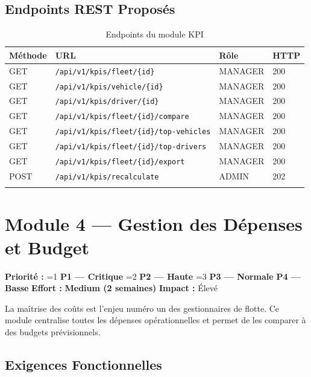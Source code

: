 \documentclass[12pt,a4paper]{report}
\newcommand{\prio}[1]{%
  \ifnum#1=1 \textcolor{fleeterror}{\textbf{P1 — Critique}}%
  \else\ifnum#1=2 \textcolor{fleetwarning}{\textbf{P2 — Haute}}%
  \else\ifnum#1=3 \textcolor{fleetsuccess}{\textbf{P3 — Normale}}%
  \else \textcolor{fleetgray}{\textbf{P4 — Basse}}%
  \fi\fi\fi}
\newcommand{\effort}[1]{\textcolor{fleetpurple}{\textbf{#1}}}
\begin{document}
\section{Endpoints REST Proposés}

\begin{longtable}{p{1.5cm}p{7cm}p{2.5cm}p{1.5cm}}
\toprule
\textbf{Méthode} & \textbf{URL} & \textbf{Rôle} & \textbf{HTTP} \\
\midrule
\endhead
GET & \texttt{/api/v1/kpis/fleet/\{id\}} & MANAGER & 200 \\
GET & \texttt{/api/v1/kpis/vehicle/\{id\}} & MANAGER & 200 \\
GET & \texttt{/api/v1/kpis/driver/\{id\}} & MANAGER & 200 \\
GET & \texttt{/api/v1/kpis/fleet/\{id\}/compare} & MANAGER & 200 \\
GET & \texttt{/api/v1/kpis/fleet/\{id\}/top-vehicles} & MANAGER & 200 \\
GET & \texttt{/api/v1/kpis/fleet/\{id\}/top-drivers} & MANAGER & 200 \\
GET & \texttt{/api/v1/kpis/fleet/\{id\}/export} & MANAGER & 200 \\
POST & \texttt{/api/v1/kpis/recalculate} & ADMIN & 202 \\
\bottomrule
\caption{Endpoints du module KPI}
\end{longtable}

\chapter{Module 4 — Gestion des Dépenses et Budget}

\begin{tcolorbox}[colback=fleetwarning!5, colframe=fleetwarning, title={\bfseries Résumé du Module}, fonttitle=\color{white}]
\textbf{Priorité :} \prio{2} \quad \textbf{Effort :} \effort{Medium (2 semaines)} \quad \textbf{Impact :} Élevé

La maîtrise des coûts est l'enjeu numéro un des gestionnaires de flotte. Ce module centralise toutes les dépenses opérationnelles et permet de les comparer à des budgets prévisionnels.
\end{tcolorbox}

\section{Exigences Fonctionnelles}
\end{document}
